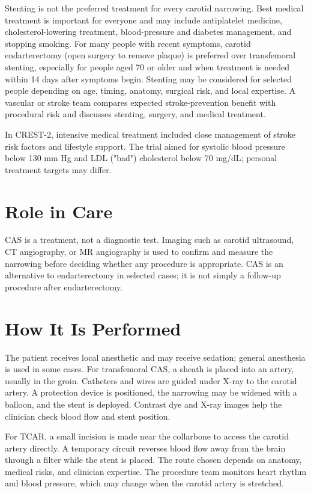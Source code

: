 Stenting is not the preferred treatment for every carotid narrowing. Best medical treatment is important for everyone and may include antiplatelet medicine, cholesterol-lowering treatment, blood-pressure and diabetes management, and stopping smoking. For many people with recent symptoms, carotid endarterectomy (open surgery to remove plaque) is preferred over transfemoral stenting, especially for people aged 70 or older and when treatment is needed within 14 days after symptoms begin. Stenting may be considered for selected people depending on age, timing, anatomy, surgical risk, and local expertise. A vascular or stroke team compares expected stroke-prevention benefit with procedural risk and discusses stenting, surgery, and medical treatment.

In CREST-2, intensive medical treatment included close management of stroke risk factors and lifestyle support. The trial aimed for systolic blood pressure below 130 mm Hg and LDL ("bad") cholesterol below 70 mg/dL; personal treatment targets may differ.

\section*{Role in Care}
CAS is a treatment, not a diagnostic test. Imaging such as carotid ultrasound, CT angiography, or MR angiography is used to confirm and measure the narrowing before deciding whether any procedure is appropriate. CAS is an alternative to endarterectomy in selected cases; it is not simply a follow-up procedure after endarterectomy.

\section*{How It Is Performed}
The patient receives local anesthetic and may receive sedation; general anesthesia is used in some cases. For transfemoral CAS, a sheath is placed into an artery, usually in the groin. Catheters and wires are guided under X-ray to the carotid artery. A protection device is positioned, the narrowing may be widened with a balloon, and the stent is deployed. Contrast dye and X-ray images help the clinician check blood flow and stent position.

For TCAR, a small incision is made near the collarbone to access the carotid artery directly. A temporary circuit reverses blood flow away from the brain through a filter while the stent is placed. The route chosen depends on anatomy, medical risks, and clinician expertise. The procedure team monitors heart rhythm and blood pressure, which may change when the carotid artery is stretched.


